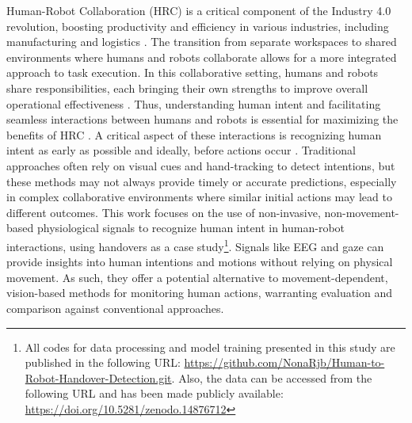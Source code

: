 Human-Robot Collaboration (HRC) is a critical component of the Industry 4.0 revolution, boosting productivity and efficiency in various industries, including manufacturing and logistics 
\cite{HRC_industry_4,survey_review_2022_object_handovers}. The transition from separate workspaces to shared environments where humans and robots collaborate allows for a more integrated approach to task execution. In this collaborative setting, humans and robots share responsibilities, each bringing their own strengths to improve overall operational effectiveness \citet{human_role_safety_collab_industry4}. 
Thus, understanding human intent and facilitating seamless interactions between humans and robots is essential for maximizing the benefits of HRC \cite{comm_intent_before_HRC_strabala2012,intention_multimodal_Wang2022}. A critical aspect of these interactions is 
recognizing human intent as early as possible and ideally, before actions occur \cite{non_invasive_real_time_activity_track_human,gaze_vs_hand_moving_target,comm_intent_before_HRC_strabala2012}. 
Traditional approaches often rely on visual cues and hand-tracking to detect intentions, but these methods may not always provide timely or accurate predictions, especially in complex collaborative environments \cite{intention_multimodal_Wang2022, comm_intent_before_HRC_strabala2012} where similar initial actions may lead to different outcomes. 
This work focuses on the use of non-invasive, non-movement-based physiological signals to recognize human intent in human-robot interactions, using handovers as a case study\footnote[3]{All codes for data processing and model training presented in this study are published in the following URL: {\small \url{https://github.com/NonaRjb/Human-to-Robot-Handover-Detection.git}}. Also, the data can be accessed from the following URL and has been made publicly available: \small{\url{https://doi.org/10.5281/zenodo.14876712}}}. Signals like EEG and gaze can provide insights into human intentions and motions without relying on physical movement. As such, they offer a potential alternative to movement-dependent, vision-based methods for monitoring human actions, warranting evaluation and comparison against conventional approaches.


